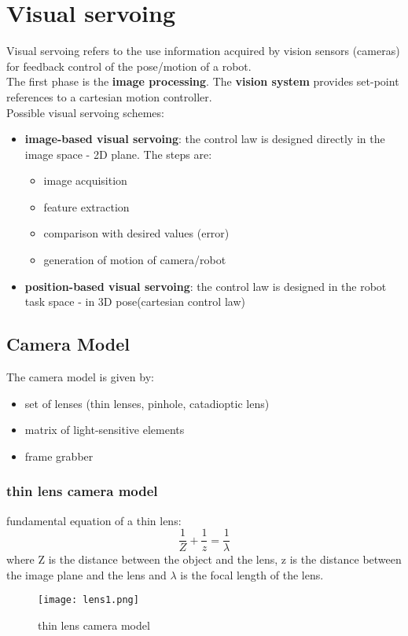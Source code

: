\documentclass[a4paper,12pt]{article}
\begin{document}
\section{Visual servoing}
Visual servoing refers to the
use information acquired by vision sensors (cameras)
for feedback control of the pose/motion of a robot.\\
The first phase is the \textbf{image processing}.
The \textbf{vision system} provides set-point references to a cartesian 
motion controller.\\
Possible visual servoing schemes:
\begin{itemize}
    \item \textbf{image-based visual servoing}: the control law
     is designed directly in the image space - 2D plane.
      The steps are: \begin{itemize}
        \item image acquisition 
        \item feature extraction
        \item comparison with desired values (error)
        \item generation of motion of camera/robot
      \end{itemize}
    \item \textbf{position-based visual servoing}: the control 
    law is designed
    in the robot task space - in 3D pose(cartesian control law)
\end{itemize}
\subsection{Camera Model}
The camera model is given by:
\begin{itemize}
\item set of lenses (thin lenses, pinhole, catadioptic lens)
\item matrix of light-sensitive elements
\item frame grabber
\end{itemize}
\subsubsection{thin lens camera model}
fundamental equation of a thin lens:
\begin{equation}
\frac{1}{Z}+\frac{1}{z}=\frac{1}{\lambda}
\end{equation}
where Z is the distance between the object and the lens,
 z is the distance between the image plane and the lens and
    $\lambda$ is the focal length of the lens.\\
    \begin{figure}
        \centering
        \texttt{[image: lens1.png]}
        \caption{thin lens camera model}
        \label{fig:thin lens camera model}
    \end{figure}
\end{document}
